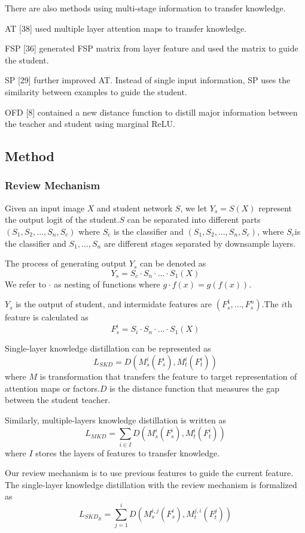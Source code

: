 \documentclass[11pt]{article}
\begin{document}
There are also methods using multi-stage information to transfer knowledge.

AT [38] used multiple layer attention maps to transfer knowledge.

FSP [36] generated FSP matrix from layer feature and used the matrix to guide the student.

SP [29] further improved AT. Instead of single input information, SP uses the similarity between examples to guide the student.

OFD [8] contained a new distance function to distill major information between the teacher and student using marginal ReLU.
\subsection{Method}
\subsubsection{Review Mechanism}
Given an input image $X$ and student network $S$, we let $Y_s = S(X)$ represent the output logit of the student.$S$ can be separated into different parts $(S_1, S_2, ..., S_n, S_c)$ where $S_c$ is the classifier and $(S_1, S_2, ..., S_n, S_c)$, where $S_c$is the classifier and $S_1,...,S_n$ are different stages separated by downsample layers.

The process of generating output $Y_s$ can be denoted as 
$$Y_s = S_c\cdot S_n\cdot ...\cdot S_1(X)$$
We refer to $\cdot$ as nesting of functions where $g\cdot f(x) = g(f(x))$.

$Y_s$ is the output of student, and intermidate features are $(F_s^1,...,F_s^n)$.The $i$th feature is calculated as 
$$F^i_s = S_i\cdot S_n\cdot ...\cdot S_1(X)$$

Single-layer knowledge distillation can be represented as 
$$L_{SKD} = D(M_s^i(F_s^i), M_t^i(F_t^i))$$
where $M$ is transformation that transfers the feature to target representation of attention maps or factors.$D$ is the distance function that measures the gap between the student teacher.

Similarly, multiple-layers knowledge distillation is written as 
$$L_{MKD} = \sum_{i\in I}D(M_s^i(F_s^i),M_t^i(F_t^i))$$
where $I$ stores the layers of features to transfer knowledge.

Our review mechanism is to use previous features to guide the current feature. The single-layer knowledge distillation with the review mechanism is formalized as 
$$L_{SKD_R} = \sum_{j=1}^{i}D(M_s^{i,j}(F_s^i),M_t^{j,i}(F_t^j))$$
\end{document}
